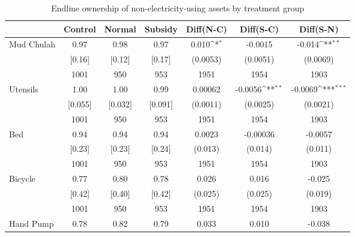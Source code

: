 \begin{table}[htbp]\centering
\def\sym#1{\ifmmode^{#1}\else\(^{#1}\)\fi}
\caption{Endline ownership of non-electricity-using assets by treatment group \label{tab:"balance"}}
\begin{tabular*}{1\hsize}{@{\hskip\tabcolsep\extracolsep\fill}l*{1}{cccccc}}
\toprule
                                &  Control&   Normal&  Subsidy&Diff(N-C)         &Diff(S-C)         &Diff(S-N)         \\
\midrule
Mud Chulah                      &     0.97&     0.98&     0.97&    0.010\sym{*}  &  -0.0015         &   -0.014\sym{**} \\
                                &   [0.16]&   [0.12]&   [0.17]& (0.0053)         & (0.0051)         & (0.0069)         \\
                                &     1001&      950&      953&     1951         &     1954         &     1903         \\
Utensils                        &     1.00&     1.00&     0.99&  0.00062         &  -0.0056\sym{**} &  -0.0069\sym{***}\\
                                &  [0.055]&  [0.032]&  [0.091]& (0.0011)         & (0.0025)         & (0.0021)         \\
                                &     1001&      950&      953&     1951         &     1954         &     1903         \\
Bed                             &     0.94&     0.94&     0.94&   0.0023         & -0.00036         &  -0.0057         \\
                                &   [0.23]&   [0.23]&   [0.24]&  (0.013)         &  (0.014)         &  (0.011)         \\
                                &     1001&      950&      953&     1951         &     1954         &     1903         \\
Bicycle                         &     0.77&     0.80&     0.78&    0.026         &    0.016         &   -0.025         \\
                                &   [0.42]&   [0.40]&   [0.42]&  (0.025)         &  (0.025)         &  (0.019)         \\
                                &     1001&      950&      953&     1951         &     1954         &     1903         \\
Hand Pump                       &     0.78&     0.82&     0.79&    0.033         &    0.010         &   -0.038         \\

\end{tabular*}
\end{table}
